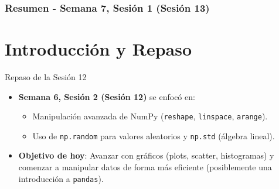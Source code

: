 \documentclass[10pt]{beamer}
\begin{document}
\myfront{}

\begin{frame}
  \titlepage
\end{frame}

\begin{frame}
  \frametitle{Resumen - Semana 7, Sesión 1 (Sesión 13)}
  \tableofcontents
\end{frame}


\section{Introducción y Repaso}

\begin{frame}{Repaso de la Sesión 12}
  \begin{itemize}
    \item \textbf{Semana 6, Sesión 2 (Sesión 12)} se enfocó en:
      \begin{itemize}
        \item Manipulación avanzada de NumPy (\texttt{reshape}, \texttt{linspace}, \texttt{arange}).
        \item Uso de \texttt{np.random} para valores aleatorios y \texttt{np.std} (álgebra lineal).
      \end{itemize}
    \item \textbf{Objetivo de hoy}: Avanzar con gráficos (plots, scatter, histogramas) y comenzar a manipular datos de forma más eficiente (posiblemente una introducción a \texttt{pandas}).
  \end{itemize}
\end{frame}
\end{document}
